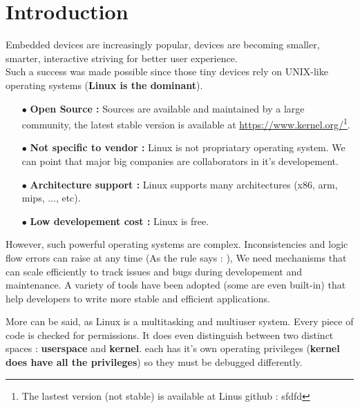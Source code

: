 \section{Introduction}
{\Large Embedded devices are increasingly popular, devices are becoming smaller, smarter, interactive striving for better user experience.\\

Such a success was made possible since those tiny devices rely on UNIX-like operating systems (\textbf{Linux is the dominant}). 

\begin{itemize}
	\item[$\bullet$] \textbf{Open Source : } Sources are available and maintained by a large community, the latest stable version is available at {\color{blue}\url{https://www.kernel.org/}}\footnote{The lastest version (not stable) is available at Linus github : {\color{blue}sfdfd}}.
	
	\item[$\bullet$] \textbf{Not specific to vendor : } Linux is not propriatary operating system. We can point that major big companies are collaborators in it's developement.
	
	\item[$\bullet$] \textbf{Architecture support : } Linux supports many architectures (x86, arm, mips, ..., etc).
	
	\item[$\bullet$] \textbf{Low developement cost : } Linux is free. 
\end{itemize}

\vspace{10px}

However, such powerful operating systems are complex. Inconsistencies and logic flow errors can raise at any time (As the rule says :  \fg),
We need mechanisms that can scale efficiently to track issues and bugs during developement and maintenance. A variety of tools have been adopted (some are even built-in) that help developers to write more stable and efficient applications.\\

\vspace{10px}

More can be said, as Linux is a multitasking and multiuser system. Every piece of code is checked for permissions. It
does even distinguish between two distinct spaces : \textbf{userspace} and \textbf{kernel}. each has it's own operating privileges (\textbf{kernel does have all the privileges}) so they must be debugged differently.

}